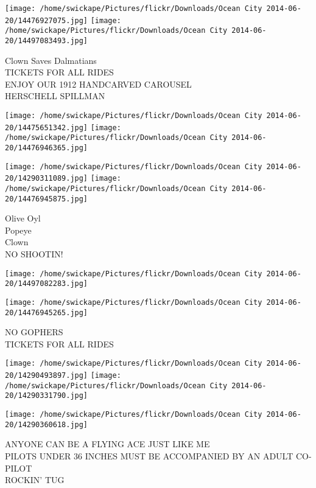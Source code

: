 \documentclass[10pt,letterpaper]{article}
\begin{document}
\texttt{[image: /home/swickape/Pictures/flickr/Downloads/Ocean City 2014-06-20/14476927075.jpg]}
\texttt{[image: /home/swickape/Pictures/flickr/Downloads/Ocean City 2014-06-20/14497083493.jpg]}

Clown Saves Dalmatians\\
TICKETS FOR ALL RIDES\\
ENJOY OUR 1912 HANDCARVED CAROUSEL\\
HERSCHELL SPILLMAN\\
\pagebreak

\texttt{[image: /home/swickape/Pictures/flickr/Downloads/Ocean City 2014-06-20/14475651342.jpg]}
\texttt{[image: /home/swickape/Pictures/flickr/Downloads/Ocean City 2014-06-20/14476946365.jpg]}

\texttt{[image: /home/swickape/Pictures/flickr/Downloads/Ocean City 2014-06-20/14290311089.jpg]}
\texttt{[image: /home/swickape/Pictures/flickr/Downloads/Ocean City 2014-06-20/14476945875.jpg]}

Olive Oyl\\
Popeye\\
Clown\\
NO SHOOTIN!\\
\pagebreak

\texttt{[image: /home/swickape/Pictures/flickr/Downloads/Ocean City 2014-06-20/14497082283.jpg]}

\vspace{0.25in}
\texttt{[image: /home/swickape/Pictures/flickr/Downloads/Ocean City 2014-06-20/14476945265.jpg]}

NO GOPHERS\\
TICKETS FOR ALL RIDES\\
\pagebreak

\texttt{[image: /home/swickape/Pictures/flickr/Downloads/Ocean City 2014-06-20/14290493897.jpg]}
\texttt{[image: /home/swickape/Pictures/flickr/Downloads/Ocean City 2014-06-20/14290331790.jpg]}

\texttt{[image: /home/swickape/Pictures/flickr/Downloads/Ocean City 2014-06-20/14290360618.jpg]}

ANYONE CAN BE A FLYING ACE JUST LIKE ME\\
PILOTS UNDER 36 INCHES MUST BE ACCOMPANIED BY AN ADULT CO{-}PILOT\\
ROCKIN' TUG\\
\pagebreak
\end{document}
